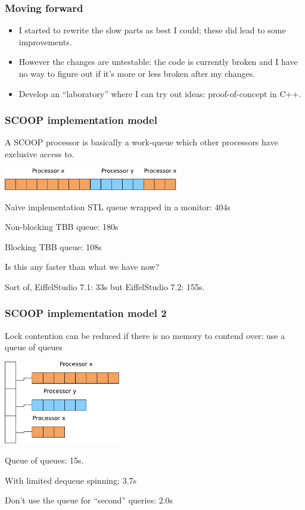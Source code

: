 \documentclass{beamer}
\begin{document}
\begin{frame}
  \frametitle{Moving forward}

  \begin{itemize}[<+->]
  \item I started to rewrite the slow parts as best I could;
    these did lead to some improvements.
  \item However the changes are untestable: the code is currently
    broken and I have no way to figure out if it's more or less broken 
    after my changes.
  \item Develop an ``laboratory'' where I can try out ideas: 
    proof-of-concept in C++.
  \end{itemize}
\end{frame}

\begin{frame}
  \frametitle{SCOOP implementation model}
  
  A SCOOP processor is basically a work-queue which
  other processors have exclusive access to.
  \begin{center}
    \includegraphics[width=3in]{queue-naive}
  \end{center}

  \pause
  Na\"ive implementation STL queue wrapped in a monitor: 404s

  \pause
  Non-blocking TBB queue: 180s

  \pause
  Blocking TBB queue: 108s

  \pause
  \vskip 1cm
  Is this any faster than what we have now?
  \pause

  Sort of, EiffelStudio 7.1: 33s but EiffelStudio 7.2: 155s.
\end{frame}

\begin{frame}
  \frametitle{SCOOP implementation model 2}
  
  Lock contention can be reduced if there is no
  memory to contend over:
  use a queue of queues

  \begin{center}
    \includegraphics[width=2in]{queue-of-queues}
  \end{center}
  \pause
  Queue of queues: 15s.

  \pause
  With limited dequeue spinning: 3.7s

  \pause
  Don't use the queue for ``second'' queries: 2.0s
\end{frame}
\end{document}
